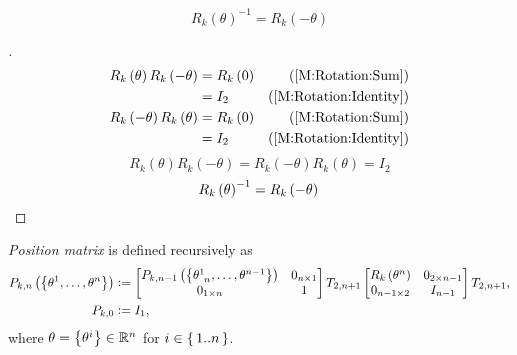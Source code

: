 \documentclass[stu, babel, american, biblatex, a4paper, leqno, draftall]{apa7}
\begin{document}
\begin{corollary}\label{M:Rotation:Inverse}
    \begin{equation*}
        R_k\left(\theta\right)^{-1} = R_k\left(-\theta\right)
    \end{equation*}
\end{corollary}
\begin{proof}[]
    \begin{align*}
        R_k\left(\theta\right)R_k\left(-\theta\right)
         & = R_k\left(0\right) & \text{(\cref{M:Rotation:Sum})}      \\
         & = I_2               & \text{(\cref{M:Rotation:Identity})} \\
        R_k\left(-\theta\right)R_k\left(\theta\right)
         & = R_k\left(0\right) & \text{(\cref{M:Rotation:Sum})}      \\
         & = I_2               & \text{(\cref{M:Rotation:Identity})}
    \end{align*}
    \begin{equation*}
        R_k\left(\theta\right)R_k\left(-\theta\right)
        = R_k\left(-\theta\right)R_k\left(\theta\right)
        = I_2
    \end{equation*}
    \begin{equation*}
        {R_k\left(\theta\right)}^{-1}
        =
        R_k\left(-\theta\right)
        \qedhere
    \end{equation*}
\end{proof}
\begin{definition}\label{M:Position}
    \textit{Position matrix} is defined recursively as
    \begin{align*}
        P_{k,n}\left(\left\{\tensor{\theta}{^1},\dots,\tensor{\theta}{^n}\right\}\right) & \defeq
        \begin{bmatrix}
            P_{k,n-1}\left(\left\{\tensor{\theta}{^1_{n}},\dots,\tensor{\theta}{^{n-1}}\right\}\right) & 0_{n\times 1} \\
            0_{1\times n}                                                                              & 1             \\
        \end{bmatrix}
        T_{2,n+1}
        \begin{bmatrix}
            R_k\left(\tensor{\theta}{^n}\right) & 0_{{2}\times{n-1}} \\
            0_{{n-1}\times{2}}                  & {I}_{n-1}          \\
        \end{bmatrix}
        T_{2,n+1} \text{,}                                                                                    \\
        P_{k,0}                                                                          & \defeq I_1\text{,}
    \end{align*}
    where $\theta=\left\{\tensor{\theta}{^i}\right\}\in\R^n$ for $i\in\set{1..n}$.
\end{definition}
\end{document}
